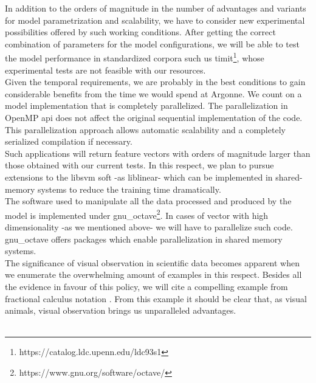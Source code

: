 \documentclass[11pt,a4paper]{article}
\begin{document}
In addition to the orders of magnitude in the number of advantages and variants for 
model parametrization and scalability, we have to consider new experimental
possibilities offered by such working conditions.
After getting the correct combination of parameters for the model configurations,
we will be able to test the model performance in standardized corpora such us
\gls{timit}\footnote{https://catalog.ldc.upenn.edu/ldc93s1}, whose experimental tests
are not feasible with our resources. \\

Given the temporal requirements, we are probably in the best conditions to gain
considerable benefits from the time we would spend at Argonne.
We count on a model implementation that is completely parallelized. %
The parallelization in OpenMP \gls{api} does not affect the original sequential implementation
of the code. This parallelization approach allows automatic scalability and a completely serialized
compilation if necessary. \\

Such applications will return feature vectors with orders of magnitude larger than those obtained with our current tests.
In this respect, we plan to pursue extensions to the \gls{libsvm} soft -as \gls{liblinear}- which can be implemented in
shared-memory systems to reduce the training time dramatically. \\

The software used to manipulate all the data processed and produced by the model
is implemented under \gls{gnu_octave}\footnote{https://www.gnu.org/software/octave/}.
In cases of vector with high dimensionality -as we mentioned above-
we will have to parallelize such code.
\gls{gnu_octave} offers packages which enable parallelization in shared memory systems. \\

The significance of visual observation in scientific data becomes apparent
when we enumerate the overwhelming amount of examples in this respect.
Besides all the evidence in favour of this policy, we will cite
a compelling example from fractional calculus notation \cite{Miller_1993}.
From this example it should be clear that, as visual animals,
visual observation brings us unparalleled advantages. \\

 \\
\end{document}
